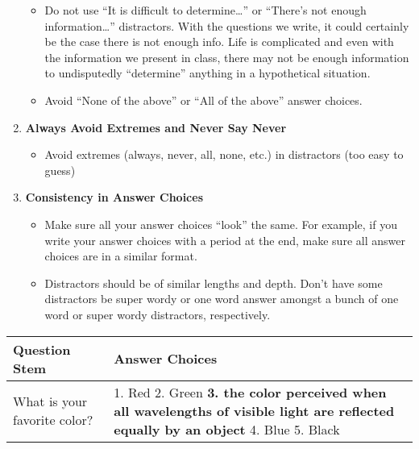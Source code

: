 \documentclass[
]{article}
\providecommand{\tightlist}{%
  \setlength{\itemsep}{0pt}\setlength{\parskip}{0pt}}
\begin{document}
\begin{enumerate}
  \begin{itemize}
  \tightlist
  \item
    Do not use ``It is difficult to determine\ldots{}'' or ``There's not enough information\ldots{}'' distractors. With the questions we write, it could certainly be the case there is not enough info. Life is complicated and even with the information we present in class, there may not be enough information to undisputedly ``determine'' anything in a hypothetical situation.
  \item
    Avoid ``None of the above'' or ``All of the above'' answer choices.
  \end{itemize}
\item
  \textbf{Always Avoid Extremes and Never Say Never}

  \begin{itemize}
  \tightlist
  \item
    Avoid extremes (always, never, all, none, etc.) in distractors (too easy to guess)
  \end{itemize}
\item
  \textbf{Consistency in Answer Choices}

  \begin{itemize}
  \tightlist
  \item
    Make sure all your answer choices ``look'' the same. For example, if you write your answer choices with a period at the end, make sure all answer choices are in a similar format.
  \item
    Distractors should be of similar lengths and depth. Don't have some distractors be super wordy or one word answer amongst a bunch of one word or super wordy distractors, respectively.
  \end{itemize}
\end{enumerate}

\begin{longtable}[]{@{}ll@{}}
\toprule
\begin{minipage}[b]{0.30\columnwidth}\raggedright
\textbf{Question Stem}\strut
\end{minipage} & \begin{minipage}[b]{0.64\columnwidth}\raggedright
\textbf{Answer Choices}\strut
\end{minipage}\tabularnewline
\midrule
\endhead
\begin{minipage}[t]{0.30\columnwidth}\raggedright
What is your favorite color?\strut
\end{minipage} & \begin{minipage}[t]{0.64\columnwidth}\raggedright
1. Red 2. Green \textbf{3. the color perceived when all wavelengths of visible light are reflected equally by an object} 4. Blue 5. Black\strut
\end{minipage}\tabularnewline
\bottomrule
\end{longtable}
\end{document}
